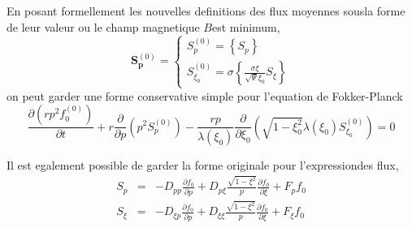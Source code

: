 En posant formellement les nouvelles definitions des flux moyennes
sousla forme de leur valeur ou le champ magnetique $B$est minimum,
\[
\mathbf{S}_{\mathbf{p}}^{(0)}=\left\{ \begin{array}{l}
S_{p}^{(0)}=\left\{ S_{p}\right\} \\
S_{\xi_{0}}^{(0)}=\sigma\left\{ \frac{\sigma\xi}{\sqrt{\Psi}\xi_{0}}S_{\xi}\right\} \end{array}\right.\]
 on peut garder une forme conservative simple pour l'equation de Fokker-Planck\[
\frac{\partial\left(rp^{2}f_{0}^{(0)}\right)}{\partial t}+r\frac{\partial}{\partial p}(p^{2}S_{p}^{(0)})-\frac{rp}{\lambda\left(\xi_{0}\right)}\frac{\partial}{\partial\xi_{0}}\left(\sqrt{1-\xi_{0}^{2}}\lambda\left(\xi_{0}\right)S_{\xi_{0}}^{(0)}\right)=0\]


Il est egalement possible de garder la forme originale pour l'expressiondes
flux, \begin{eqnarray*}
S_{p} & = & -D_{pp}\frac{\partial f_{0}}{\partial p}+D_{p\xi}\frac{\sqrt{1-\xi^{2}}}{p}\frac{\partial f_{0}}{\partial\xi}+F_{p}f_{0}\\
S_{\xi} & = & -D_{\xi p}\frac{\partial f_{0}}{\partial p}+D_{\xi\xi}\frac{\sqrt{1-\xi^{2}}}{p}\frac{\partial f_{0}}{\partial\xi}+F_{\xi}f_{0}\end{eqnarray*}


